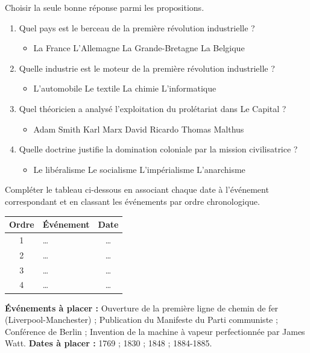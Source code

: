 \documentclass[11pt]{article}
\begin{document}
\begin{exercice}
Choisir la seule bonne réponse parmi les propositions.
\begin{enumerate}
    \item Quel pays est le berceau de la première révolution industrielle ?
    \begin{itemize}
        \item[A.] La France \quad [B.] L'Allemagne \quad [C.] La Grande-Bretagne \quad [D.] La Belgique
    \end{itemize}
    \item Quelle industrie est le moteur de la première révolution industrielle ?
    \begin{itemize}
        \item[A.] L'automobile \quad [B.] Le textile \quad [C.] La chimie \quad [D.] L'informatique
    \end{itemize}
    \item Quel théoricien a analysé l'exploitation du prolétariat dans \og Le Capital \fg ?
    \begin{itemize}
        \item[A.] Adam Smith \quad [B.] Karl Marx \quad [C.] David Ricardo \quad [D.] Thomas Malthus
    \end{itemize}
    \item Quelle doctrine justifie la domination coloniale par la \og mission civilisatrice \fg ?
    \begin{itemize}
        \item[A.] Le libéralisme \quad [B.] Le socialisme \quad [C.] L'impérialisme \quad [D.] L'anarchisme
    \end{itemize}
\end{enumerate}
\end{exercice}

\begin{exercice}
Compléter le tableau ci-dessous en associant chaque date à l'événement correspondant et en classant les événements par ordre chronologique.
\begin{center}
\begin{tabular}{|c|p{6cm}|c|}
\hline
\textbf{Ordre} & \textbf{Événement} & \textbf{Date} \\
\hline
1 & \ldots & \ldots \\
2 & \ldots & \ldots \\
3 & \ldots & \ldots \\
4 & \ldots & \ldots \\
\hline
\end{tabular}
\end{center}
\textbf{Événements à placer :} Ouverture de la première ligne de chemin de fer (Liverpool-Manchester) ; Publication du \og Manifeste du Parti communiste \fg ; Conférence de Berlin ; Invention de la machine à vapeur perfectionnée par James Watt.
\textbf{Dates à placer :} 1769 ; 1830 ; 1848 ; 1884-1885.
\end{exercice}
\end{document}

